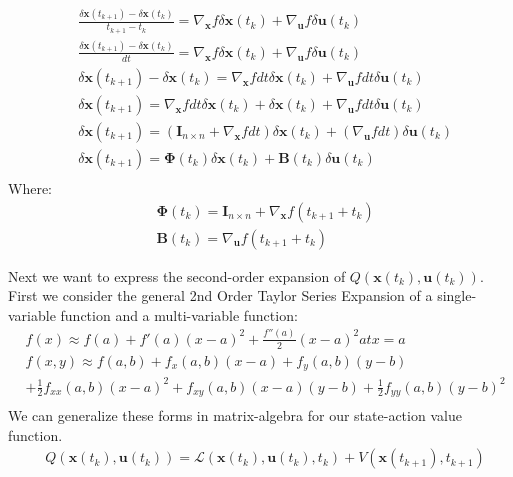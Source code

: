 \documentclass[11pt]{homework}
\renewcommand{\vec}[1]{\ensuremath{\boldsymbol{#1}}}
\begin{document}
\begin{arabicparts}
			\begin{align*}
				& \frac{\delta \vec{x}(t_{k+1}) - \delta\vec{x}(t_{k})}{t_{k+1} - t_{k}} = \nabla_{\vec{x}}f\delta\vec{x}(t_{k}) +  \nabla_{\vec{u}}f\delta\vec{u}(t_{k}) \\
				& \frac{\delta \vec{x}(t_{k+1}) - \delta\vec{x}(t_{k})}{dt} = \nabla_{\vec{x}}f\delta\vec{x}(t_{k}) +  \nabla_{\vec{u}}f\delta\vec{u}(t_{k}) \\
				& \delta \vec{x}(t_{k+1}) - \delta\vec{x}(t_{k}) = \nabla_{\vec{x}}fdt\delta\vec{x}(t_{k}) +  \nabla_{\vec{u}}fdt\delta\vec{u}(t_{k}) \\
				& \delta \vec{x}(t_{k+1}) = \nabla_{\vec{x}}fdt\delta\vec{x}(t_{k}) + \delta\vec{x}(t_{k}) +  \nabla_{\vec{u}}fdt\delta\vec{u}(t_{k}) \\
				& \delta \vec{x}(t_{k+1}) =  \left(\vec{I}_{n \times n} + \nabla_{\vec{x}}fdt\right)\delta\vec{x}(t_{k}) + (\nabla_{\vec{u}}fdt)\delta\vec{u}(t_{k}) \\
				& \delta \vec{x}(t_{k+1}) =  \vec{\Phi}(t_{k})\delta\vec{x}(t_{k}) + \vec{B}(t_{k})\delta\vec{u}(t_{k}) \\
			\end{align*}
		Where: 
			\begin{align*}
				& \vec{\Phi}(t_{k}) = \vec{I}_{n \times n} + \nabla_{\vec{x}}f(t_{k+1} + t_{k}) \\
				& \vec{B}(t_{k}) = \nabla_{\vec{u}}f(t_{k+1} + t_{k})
			\end{align*}
		
		
		\questionpart
		
		Next we want to express the second-order expansion of $Q(\vec{x}(t_{k}), \vec{u}(t_{k}))$. First we consider the general 2nd Order Taylor Series Expansion of a single-variable function and a multi-variable function:  
			\begin{align*}
				& f(x) \approx f(a) + f'(a)(x-a)^{2} + \frac{f''(a)}{2}(x-a)^{2} at x = a\\
				& f(x,y) \approx f(a,b) + f_{x}(a,b)(x-a) + f_{y}(a,b)(y-b)  \\
				& + \frac{1}{2}f_{xx}(a,b)(x-a)^2 + f_{xy}(a,b)(x-a)(y-b) + \frac{1}{2}f_{yy}(a,b)(y-b)^2 \\
			\end{align*}
		We can generalize these forms in matrix-algebra for our state-action value function.
			\begin{align*}
				& Q(\vec{x}(t_{k}), \vec{u}(t_{k})) = \mathcal{L}(\vec{x}(t_{k}), \vec{u}(t_{k}), t_{k}) + V(\vec{x}(t_{k+1}), t_{k+1})
			\end{align*}
		

\end{arabicparts}
\end{document}
